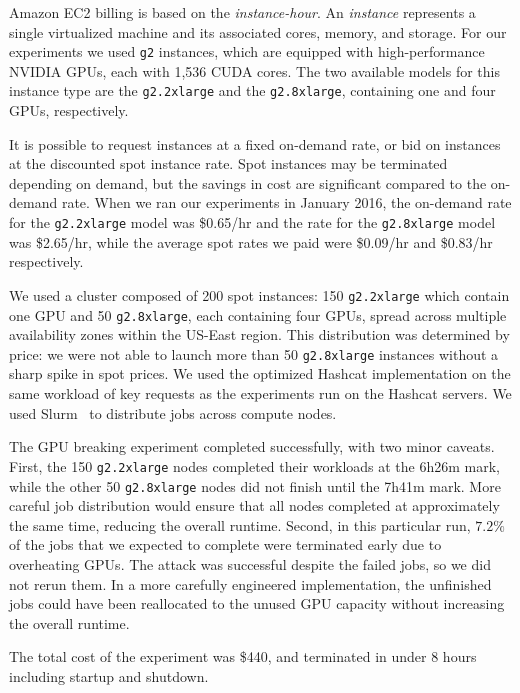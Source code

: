 \label{sec:ec2-details}


Amazon EC2 billing is based on the \textit{instance-hour}. An \textit{instance} represents a single virtualized machine and its associated cores, memory, and storage. For our experiments we used \texttt{g2} instances, which are equipped with high-performance NVIDIA GPUs, each with 1,536 CUDA cores. The two available models for this instance type are the \texttt{g2.2xlarge} and the \texttt{g2.8xlarge}, containing one and four GPUs, respectively.

It is possible to request instances at a fixed on-demand rate, or bid on instances at the discounted spot instance rate. Spot instances may be terminated depending on demand, but the savings in cost are significant compared to the on-demand rate. 
When we ran our experiments in January 2016, the on-demand rate for the \texttt{g2.2xlarge} model was \$0.65/hr and the rate for the \texttt{g2.8xlarge} model was \$2.65/hr, while the average spot rates we paid were \$0.09/hr and \$0.83/hr respectively.

We used a cluster composed of 200 spot instances: 150 \texttt{g2.2xlarge} which contain one GPU and 50 \texttt{g2.8xlarge}, each containing four GPUs, spread across multiple availability zones within the US-East region.
This distribution was determined by price: we were not able to launch more than 50 \texttt{g2.8xlarge} instances without a sharp spike in spot prices. We used the optimized Hashcat implementation on the same workload of key requests as the experiments run on the Hashcat servers.  We used Slurm~\cite{yoo2003slurm} to distribute jobs across compute nodes.

The GPU breaking experiment completed successfully, with two minor caveats. First, the 150 \texttt{g2.2xlarge} nodes completed their workloads at the 6h26m mark, while the other 50 \texttt{g2.8xlarge} nodes did not finish until the 7h41m mark. More careful job distribution would ensure that all nodes completed at approximately the same time, reducing the overall runtime. Second, in this particular run, $7.2\%$ of the jobs that we expected to complete were terminated early due to overheating GPUs.  The attack was successful despite the failed jobs, so we did not rerun them. In a more carefully engineered implementation, the unfinished jobs could have been reallocated to the unused GPU capacity without increasing the overall runtime.

The total cost of the experiment was \$440, and terminated in under 8 hours including startup and shutdown.

